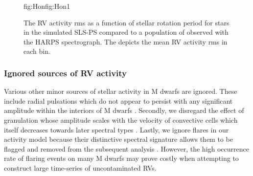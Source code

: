 \begin{figure}
\begin{ocg}{fig:Hon}{fig:Hon}{1}
  \end{ocg}
  \hspace{-0.6\hsize}%
  \caption[RV activity rms versus stellar rotation period.]
      {\small The RV activity rms as a function of stellar rotation period for stars in the simulated SLS-PS compared
    to a population of  observed with the HARPS
    spectrograph. The  depicts the mean
    RV activity rms in each \prot{} bin.}
  \label{BSfig:activityrms}
\end{figure}


\subsubsection{Ignored sources of RV activity}
Various other minor sources of stellar activity in M dwarfs are ignored. These include radial pulsations which 
do not appear to persist with any significant amplitude within the interiors of M dwarfs
\citep{rodriguezlopez15}. Secondly, we disregard the effect of granulation whose amplitude scales
with the velocity of convective cells which itself decreases towards later spectral types
\citep{dumusque11a, meunier17}.
Lastly, we ignore flares in our activity model because their distinctive
spectral signature allows them to be flagged and removed from the subsequent analysis
\citep{schmidt12, angladaescude16}.
However, the high occurrence rate of flaring events on many M dwarfs may prove costly when attempting to
construct large time-series of uncontaminated RVs.



